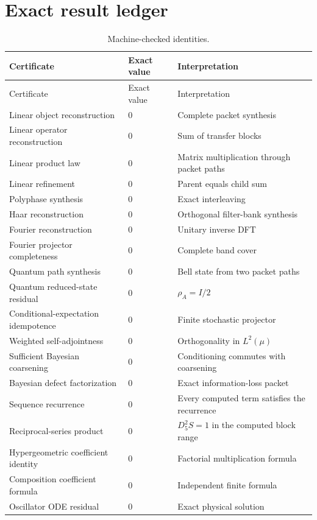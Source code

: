 \documentclass[11pt,oneside]{book}
\theoremstyle{definition}
\theoremstyle{remark}
\begin{document}
\chapter{Exact result ledger}
\begin{longtable}{L{2.15in}L{1.15in}L{2.75in}}
\caption{Machine-checked identities.}\\
\toprule
Certificate & Exact value & Interpretation \\
\midrule
\endfirsthead
\toprule
Certificate & Exact value & Interpretation \\
\midrule
\endhead
Linear object reconstruction & $0$ & Complete packet synthesis \\
Linear operator reconstruction & $0$ & Sum of transfer blocks \\
Linear product law & $0$ & Matrix multiplication through packet paths \\
Linear refinement & $0$ & Parent equals child sum \\
Polyphase synthesis & $0$ & Exact interleaving \\
Haar reconstruction & $0$ & Orthogonal filter-bank synthesis \\
Fourier reconstruction & $0$ & Unitary inverse DFT \\
Fourier projector completeness & $0$ & Complete band cover \\
Quantum path synthesis & $0$ & Bell state from two packet paths \\
Quantum reduced-state residual & $0$ & $\rho_A=I/2$ \\
Conditional-expectation idempotence & $0$ & Finite stochastic projector \\
Weighted self-adjointness & $0$ & Orthogonality in $L^2(\mu)$ \\
Sufficient Bayesian coarsening & $0$ & Conditioning commutes with coarsening \\
Bayesian defect factorization & $0$ & Exact information-loss packet \\
Sequence recurrence & $0$ & Every computed term satisfies the recurrence \\
Reciprocal-series product & $0$ & $D_5^2S=1$ in the computed block range \\
Hypergeometric coefficient identity & $0$ & Factorial multiplication formula \\
Composition coefficient formula & $0$ & Independent finite formula \\
Oscillator ODE residual & $0$ & Exact physical solution \\

\end{longtable}
\end{document}

